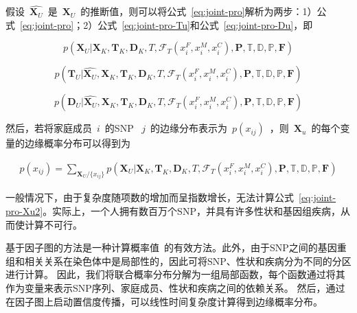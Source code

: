 假设~$\hat{\mathbf{X}_U}$~是~$\mathbf{X}_U$~的推断值，则可以将公式~\ref{eq:joint-pro}解析为两步：1）公式~\ref{eq:joint-pro}；2）公式~\ref{eq:joint-pro-Tu}和公式~\ref{eq:joint-pro-Du}，即

\begin{equation}\label{eq:joint-pro-Xu}
p(\mathbf{X}_U | \mathbf{X}_K, \mathbf{T}_K, \mathbf{D}_K, T, \mathcal{F}_T(x_i^F,x_i^M,x_i^C), \mathbf{P}, \mathbb{T}, \mathbb{D}, \mathbb{P}, \mathbf{F})
\end{equation}

\begin{equation}\label{eq:joint-pro-Tu}
p(\mathbf{T}_U |\hat{\mathbf{X}_U}, \mathbf{X}_K, \mathbf{T}_K, \mathbf{D}_K, T, \mathcal{F}_T(x_i^F,x_i^M,x_i^C), \mathbf{P}, \mathbb{T}, \mathbb{D}, \mathbb{P}, \mathbf{F})
\end{equation}

\begin{equation}\label{eq:joint-pro-Du}
p(\mathbf{D}_U |\hat{\mathbf{X}_U}, \mathbf{X}_K, \mathbf{T}_K, \mathbf{D}_K, T, \mathcal{F}_T(x_i^F,x_i^M,x_i^C), \mathbf{P}, \mathbb{T}, \mathbb{D}, \mathbb{P}, \mathbf{F})
\end{equation}


然后，若将家庭成员~$i$~的SNP ~$j$~的边缘分布表示为~$p(x_{ij})$~，则~$\mathbf{X}_u$~的每个变量的边缘概率分布可以得到为

\begin{equation}\label{eq:joint-pro-Xu2}
\begin{aligned}
p(x_{ij})= \sum_{\mathbf{X}_U/\{x_{ij}\}} p(\mathbf{X}_U | \mathbf{X}_K, \mathbf{T}_K, \mathbf{D}_K, T,  \mathcal{F}_T(x_i^F,x_i^M,x_i^C), \mathbf{P}, \mathbb{T}, \mathbb{D}, \mathbb{P}, \mathbf{F})
\end{aligned}
\end{equation}


一般情况下，由于复杂度随项数的增加而呈指数增长，无法计算公式~\ref{eq:joint-pro-Xu2}。实际上，一个人拥有数百万个SNP，并具有许多性状和基因组疾病，从而使计算不可行。


基于因子图的方法是一种计算概率值~\cite{kschischang2001factor}的有效方法。此外，由于SNP之间的基因重组和相关关系在染色体中是局部性的，因此可将SNP、性状和疾病分为不同的分区进行计算。 因此，我们将联合概率分布分解为一组局部函数，每个函数通过将其作为变量来表示SNP序列、家庭成员、性状和疾病之间的依赖关系。 然后，通过在因子图上启动置信度传播，可以线性时间复杂度计算得到边缘概率分布。


